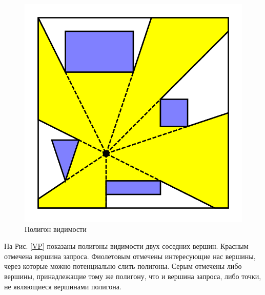 \documentclass{fefu_thesis/cls/fefu}
\begin{document}
    \begin{figure}[H]
        \centering
        \includegraphics[scale=0.35]{images/visibility_polygon.png}
        \caption{Полигон видимости}
    \end{figure}

    На Рис. \ref{VP} показаны полигоны видимости двух соседних вершин. Красным отмечена вершина запроса. Фиолетовым отмечены интересующие нас вершины, через которые можно потенциально слить полигоны. Серым отмечены либо вершины, принадлежащие тому же полигону, что и вершина запроса, либо точки, не являющиеся вершинами полигона.
\end{document}
